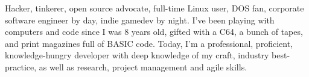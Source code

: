 \documentclass[9pt]{developercv} %
\begin{document}
\vspace{0.1cm}



\begin{minipage}[t]{0.54\textwidth} %
	\vspace{-\baselineskip} %
	
	Hacker, tinkerer, open source advocate, full-time Linux user, DOS fan, corporate software engineer by day,
	indie gamedev by night. I've been playing with computers and code since I was 8 years old, gifted with a C64,
	a bunch of tapes, and print magazines full of BASIC code. Today, I'm a professional, proficient, knowledge-hungry
	developer with deep knowledge of my craft, industry best-practice, as well as research, project management and
	agile skills.

\end{minipage}
\hfill %
\begin{minipage}[t]{0.4\textwidth} %
	\vspace{-\baselineskip} %
	\begin{barchart}{5.5}
	\end{barchart}
\end{minipage}


\begin{center}
\end{center}


\end{document}

